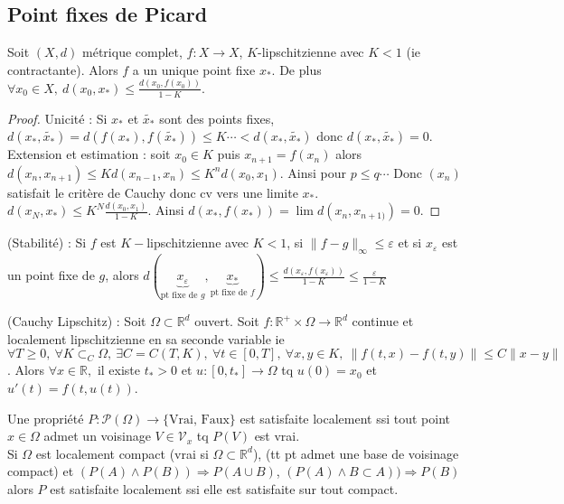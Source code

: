 \subsection{Point fixes de Picard}
\begin{propriete}
    Soit $(X,d)$ métrique complet, $f:X\to X$, $K$-lipschitzienne avec $K<1$ (ie contractante). Alors $f$ a un unique point fixe $x_*$. De plus $\forall x_0\in X,\ d(x_0,x_*)\le \frac{d(x_0,f(x_0))}{1-K}.$
\end{propriete}
\begin{proof}
    Unicité : Si $x_*$ et $\tilde{x_*}$ sont des points fixes, $d(x_*,\tilde{x_*})=d(f(x_*),f(\tilde{x_*}))\le K\cdots<d(x_*,\tilde{x_*})$ donc $d(x_*,\tilde{x_*})=0$.\\
    Extension et estimation : soit $x_0\in K$ puis $x_{n+1}=f(x_{n})$ alors $d(x_{n}, x_{n+1})\le Kd(x_{n-1},x_{n})\le K^nd(x_0,x_1)$. Ainsi pour $p\le q\cdots$
    Donc $(x_{n})$ satisfait le critère de Cauchy donc cv vers une limite $x_*.$ $d(x_N,x_*)\le K^N\frac{d(x_0,x_1)}{1-K}$. Ainsi $d(x_*,f(x_*))=\lim d(x_{n},x_{n+1)})=0$.
\end{proof}
\begin{remarque}
    (Stabilité) : Si $f$ est $K-$lipschitzienne avec $K<1$, si $\|f-g\|_\infty \le \varepsilon $ et si $x_\varepsilon $ est un point fixe de $g$, alors $d(\underbrace{x_\varepsilon }_{\text{pt fixe de }g},\underbrace{x_*}_{\text{pt fixe de }f})\le \frac{d(x_\varepsilon ,f(x_\varepsilon ))}{1-K}\le \frac{\varepsilon}{1-K}$
\end{remarque}
\begin{theoreme}
    (Cauchy Lipschitz) : Soit $\Omega\subset \mathbb{R} ^d$ ouvert. Soit $f:\mathbb{R} ^+\times \Omega\to \mathbb{R} ^d$ continue et localement lipschitzienne en sa seconde variable ie $\forall T\ge 0,\ \forall K\subset _C\Omega,\ \exists C=C(T,K),\ \forall t\in [0,T],\ \forall x,y\in K,\  \|f(t,x)-f(t,y)\|\le C\|x-y\|$. Alors $\forall x\in \mathbb{R} , $ il existe $t_*>0$ et $u:[0,t_*]\to \Omega$ tq $u(0)=x_0$ et $u'(t)=f(t,u(t))$.
\end{theoreme}
\begin{remarque}
    Une propriété $P:\mathcal{P}(\Omega)\to \{\text{Vrai, Faux}\} $ est satisfaite localement ssi tout point $x\in \Omega$ admet un voisinage $V\in \mathcal{V}_x$ tq $P(V)$ est vrai. \\Si $\Omega$ est localement compact (vrai si $\Omega\subset \mathbb{R} ^d$), (tt pt admet une base de voisinage compact) et $(P(A)\wedge P(B))\Rightarrow P(A\cup B)$, $(P(A)\wedge  B\subset A))\Rightarrow P(B)$ alors $P$ est satisfaite localement ssi elle est satisfaite sur tout compact.
\end{remarque}
